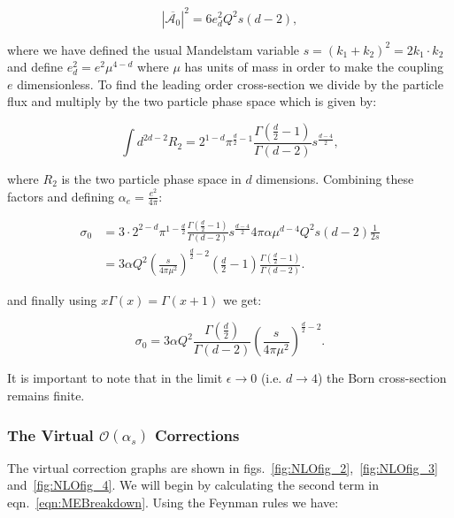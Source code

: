 		\begin{equation}
			|\overline{\mathcal{A}_0}|^2 = 6e_d^2Q^2s(d-2),
		\end{equation}

		where we have defined the usual Mandelstam variable $s=(k_1+k_2)^2=2k_1\cdot k_2$ and define $e_d^2=e^2\mu^{4-d}$ where
		$\mu$ has units of mass in order to make the coupling $e$ dimensionless.  To find the leading order cross-section we divide by the
		particle flux and multiply by the two particle phase space which is given by:

		\begin{equation}
			\int d^{2d-2}R_2 = 2^{1-d}\pi^{\frac{d}{2}-1}\frac{\Gamma(\frac{d}{2}-1)}{\Gamma(d-2)}s^\frac{d-4}{2},
		\end{equation}

		where $R_2$ is the two particle phase space in $d$ dimensions.  Combining these factors and defining $\alpha_e=\frac{e^2}{4\pi}$:

		\begin{equation}
		\begin{split}
			\sigma_0 &= 3\cdot2^{2-d}\pi^{1-\frac{d}{2}}\frac{\Gamma(\frac{d}{2}-1)}{\Gamma(d-2)}s^\frac{d-4}{2}4\pi\alpha\mu^{d-4}Q^2s(d-2)\frac{1}{2s} \\
			&= 3\alpha Q^2\left(\frac{s}{4\pi\mu^2}\right)^{\frac{d}{2}-2}\left(\frac{d}{2}-1\right)\frac{\Gamma(\frac{d}{2}-1)}{\Gamma(d-2)}.
		\end{split}
		\end{equation}

		and finally using $x\Gamma(x)=\Gamma(x+1)$ we get:

		\begin{equation}
			\sigma_0 = 3\alpha Q^2 \frac{\Gamma(\frac{d}{2})}{\Gamma(d-2)}\left(\frac{s}{4\pi\mu^2}\right)^{\frac{d}{2}-2}.
			\label{eqn:bornCrossSection}
		\end{equation}

		It is important to note that in the limit $\epsilon\to0$ (i.e. $d\to4$) the Born cross-section remains finite.

	\subsubsection{The Virtual $\mathcal{O}(\alpha_s)$ Corrections}

		The virtual correction graphs are shown in figs.~\eqref{fig:NLOfig_2},~\eqref{fig:NLOfig_3} and~\eqref{fig:NLOfig_4}.  We will begin by calculating
		the second term in eqn.~\eqref{eqn:MEBreakdown}.  Using the Feynman rules we have:

